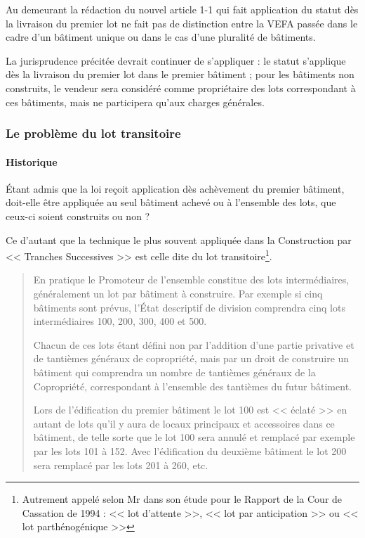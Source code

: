 			Au demeurant la rédaction du nouvel article 1\ier{}-1 qui fait application du statut dès la livraison du premier lot ne fait pas de distinction entre la VEFA passée dans le cadre d’un bâtiment unique ou dans le cas d’une pluralité de bâtiments.
		
			La jurisprudence précitée devrait continuer de s’appliquer : le statut s’applique dès la livraison du premier lot dans le premier bâtiment ; pour les bâtiments non construits, le vendeur sera considéré comme propriétaire des lots correspondant à ces bâtiments, mais ne participera qu’aux charges générales.
		
		\subsubsection{Le problème du lot transitoire}
			
			\paragraph{Historique}
			
				Étant admis que la loi reçoit application dès achèvement du premier bâtiment, doit-elle être appliquée au seul bâtiment achevé ou à l'ensemble des lots, que ceux-ci soient construits ou non ?
				
				Ce d'autant que la technique le plus souvent appliquée dans la Construction par << Tranches Successives >> est celle dite du lot transitoire\footnote{Autrement appelé selon Mr  dans son étude pour le Rapport de la Cour de Cassation de 1994 : << lot d'attente >>, << lot par anticipation >> ou << lot parthénogénique >>}.
				
				\begin{quote}
					En pratique le Promoteur de l'ensemble constitue des lots intermédiaires, généralement un lot par bâtiment à construire. Par exemple si cinq bâtiments sont prévus, l’État descriptif de division comprendra cinq lots intermédiaires 100, 200, 300, 400 et 500.

					Chacun de ces lots étant défini non par l'addition d'une partie privative et de tantièmes généraux de copropriété, mais par un droit de construire un bâtiment qui comprendra un nombre de tantièmes généraux de la Copropriété, correspondant à l’ensemble des tantièmes du futur bâtiment.
				
					Lors de l'édification du premier bâtiment le lot 100 est << éclaté >> en autant de lots qu'il y aura de locaux principaux et accessoires dans ce bâtiment, de telle sorte que le lot 100 sera annulé et remplacé par exemple par les lots 101 à 152. Avec l'édification du deuxième bâtiment le lot 200 sera remplacé par les lots 201 à 260, etc.
				\end{quote}
				
